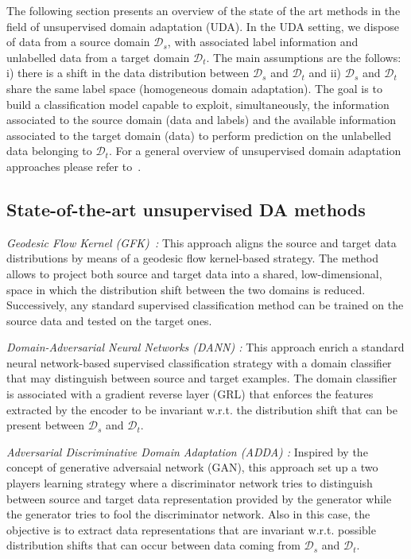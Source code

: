 The following section presents an overview of the state of the art methods in the field of unsupervised domain adaptation (UDA). In the UDA setting, we dispose of data from a source domain $\mathcal{D}_s$, with associated label information and unlabelled data from a target domain $\mathcal{D}_t$. The main assumptions are the follows: i) there is a shift in the data distribution between $\mathcal{D}_s$ and $\mathcal{D}_t$ and ii) $\mathcal{D}_s$ and $\mathcal{D}_t$ share the same label space (homogeneous domain adaptation). The goal is to build a classification model capable to exploit, simultaneously, the information associated to the source domain (data and labels) and the available information associated to the target domain (data) to perform prediction on the unlabelled data belonging to $\mathcal{D}_t$. For a general overview of unsupervised domain adaptation approaches please refer to~\cite{Kouw21}.

\subsection{State-of-the-art unsupervised DA methods}
\label{ssec:sotauda}

\textit{Geodesic Flow Kernel (GFK)~\cite{6247911}:} This approach aligns the source and target data distributions by means of a geodesic flow kernel-based strategy. The method allows to project both source and target data into a shared, low-dimensional, space in which the distribution shift between the two domains is reduced. Successively, any standard supervised classification method can be trained on the source data and tested on the target ones.

\textit{Domain-Adversarial Neural Networks (DANN) \cite{ganin2016domain}:} This approach enrich a standard neural network-based supervised classification strategy with a domain classifier that may distinguish between source and target examples.
The domain classifier is associated with a gradient reverse layer (GRL) that enforces the features extracted by the encoder to be invariant w.r.t. the distribution shift that can be present between $\mathcal{D}_s$ and $\mathcal{D}_t$.

\textit{Adversarial Discriminative Domain Adaptation (ADDA) \cite{8099799}:} Inspired by the concept of generative adversaial network (GAN), this approach set up a two players learning strategy where a discriminator network tries to distinguish between source and target data representation provided by the generator while the generator tries to fool the discriminator network. Also in this case, the objective is to extract data representations that are invariant w.r.t. possible distribution shifts that can occur between data coming from $\mathcal{D}_s$ and $\mathcal{D}_t$.


